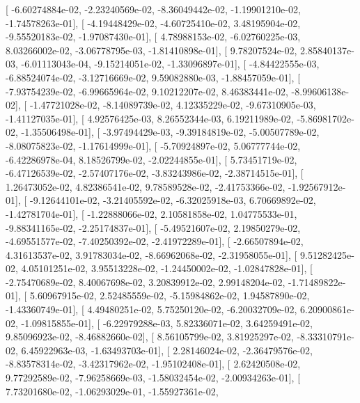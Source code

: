 \documentclass{article}
\begin{document}
       [ -6.60274884e-02,  -2.23240569e-02,  -8.36049442e-02,
         -1.19901210e-02,  -1.74578263e-01],
       [ -4.19448429e-02,  -4.60725410e-02,   3.48195904e-02,
         -9.55520183e-02,  -1.97087430e-01],
       [  4.78988153e-02,  -6.02760225e-03,   8.03266002e-02,
         -3.06778795e-03,  -1.81410898e-01],
       [  9.78207524e-02,   2.85840137e-03,  -6.01113043e-04,
         -9.15214051e-02,  -1.33096897e-01],
       [ -4.84422555e-03,  -6.88524074e-02,  -3.12716669e-02,
          9.59082880e-03,  -1.88457059e-01],
       [ -7.93754239e-02,  -6.99665964e-02,   9.10212207e-02,
          8.46383441e-02,  -8.99606138e-02],
       [ -1.47721028e-02,  -8.14089739e-02,   4.12335229e-02,
         -9.67310905e-03,  -1.41127035e-01],
       [  4.92576425e-03,   8.26552344e-03,   6.19211989e-02,
         -5.86981702e-02,  -1.35506498e-01],
       [ -3.97494429e-03,  -9.39184819e-02,  -5.00507789e-02,
         -8.08075823e-02,  -1.17614999e-01],
       [ -5.70924897e-02,   5.06777744e-02,  -6.42286978e-04,
          8.18526799e-02,  -2.02244855e-01],
       [  5.73451719e-02,  -6.47126539e-02,  -2.57407176e-02,
         -3.83243986e-02,  -2.38714515e-01],
       [  1.26473052e-02,   4.82386541e-02,   9.78589528e-02,
         -2.41753366e-02,  -1.92567912e-01],
       [ -9.12644101e-02,  -3.21405592e-02,  -6.32025918e-03,
          6.70669892e-02,  -1.42781704e-01],
       [ -1.22888066e-02,   2.10581858e-02,   1.04775533e-01,
         -9.88341165e-02,  -2.25174837e-01],
       [ -5.49521607e-02,   2.19850279e-02,  -4.69551577e-02,
         -7.40250392e-02,  -2.41972289e-01],
       [ -2.66507894e-02,   4.31613537e-02,   3.91783034e-02,
         -8.66962068e-02,  -2.31958055e-01],
       [  9.51282425e-02,   4.05101251e-02,   3.95513228e-02,
         -1.24450002e-02,  -1.02847828e-01],
       [ -2.75470689e-02,   8.40067698e-02,   3.20839912e-02,
          2.99148204e-02,  -1.71489822e-01],
       [  5.60967915e-02,   2.52485559e-02,  -5.15984862e-02,
          1.94587890e-02,  -1.43360749e-01],
       [  4.49480251e-02,   5.75250120e-02,  -6.20032709e-02,
          6.20900861e-02,  -1.09815855e-01],
       [ -6.22979288e-03,   5.82336071e-02,   3.64259491e-02,
          9.85096923e-02,  -8.46882660e-02],
       [  8.56105799e-02,   3.81925297e-02,  -8.33310791e-02,
          6.45922963e-03,  -1.63493703e-01],
       [  2.28146024e-02,  -2.36479576e-02,  -8.83578314e-02,
         -3.42317962e-02,  -1.95102408e-01],
       [  2.62420508e-02,   9.77292589e-02,  -7.96258669e-03,
         -1.58032454e-02,  -2.00934263e-01],
       [  7.73201680e-02,  -1.06293029e-01,  -1.55927361e-02,
\end{document}
